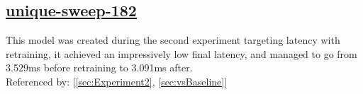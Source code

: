 \documentclass[11pt]{report}
\begin{document}
\subsection*{\protect\href{https://wandb.ai/samfh/Resnet56-Channels-Filters/runs/ptmmklr8?workspace=}{\underline{\color{blue}unique-sweep-182}}}\label{sec:unique-sweep-182}
This model was created during the second experiment targeting latency with retraining, it achieved an impressively low final latency, and managed to go from 3.529ms before retraining to 3.091ms after.\\
Referenced by: [\ref{sec:Experiment2}, \ref{sec:vsBaseline}]
\begin{figure}[H]
    \begin{table}[H]
        \centering
        \hspace{2em}
    \end{table}    
\end{figure}
\end{document}
